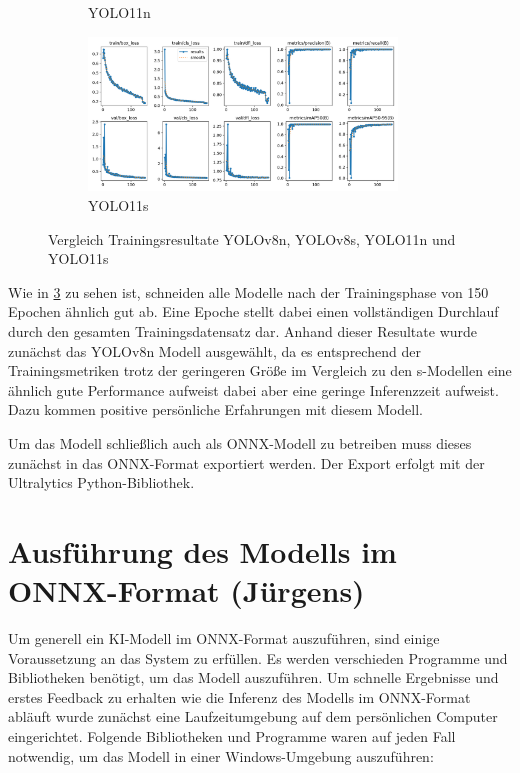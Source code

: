 \begin{figure}[h]
\begin{subfigure}[b]{0.45\textwidth}
  \caption{YOLO11n}
  \label{fig:Trainingsresultate yolo11n}
\end{subfigure}
\hfill
\begin{subfigure}[b]{0.45\textwidth}
  \centering
  \includegraphics[width=0.9\textwidth]{images/Trainingsresults_yolo11s.png}
  \caption{YOLO11s}
  \label{fig:Trainingsresultate yolo11s}
\end{subfigure}
\caption{Vergleich Trainingsresultate YOLOv8n, YOLOv8s, YOLO11n und YOLO11s}
\label{tab:Vergleich Trainingsresultate}
\end{figure}



Wie in \ref{tab:Vergleich Trainingsresultate} zu sehen ist, schneiden alle Modelle nach der Trainingsphase von 150 Epochen ähnlich gut ab. Eine Epoche stellt dabei einen vollständigen Durchlauf durch den gesamten Trainingsdatensatz dar.\cite{EpochGlossary} Anhand dieser Resultate wurde zunächst das YOLOv8n Modell ausgewählt, da es entsprechend der Trainingsmetriken trotz der geringeren Größe im Vergleich zu den s-Modellen eine ähnlich gute Performance aufweist dabei aber eine geringe Inferenzzeit aufweist. Dazu kommen positive persönliche Erfahrungen mit diesem Modell. 


Um das Modell schließlich auch als ONNX-Modell zu betreiben muss dieses zunächst in das ONNX-Format exportiert werden. Der Export erfolgt mit der Ultralytics Python-Bibliothek.

\section{Ausführung des Modells im ONNX-Format (Jürgens)}
Um generell ein KI-Modell im ONNX-Format auszuführen, sind einige Voraussetzung an das System zu erfüllen. Es werden verschieden Programme und Bibliotheken benötigt, um das Modell auszuführen. Um schnelle Ergebnisse und erstes Feedback zu erhalten wie die Inferenz des Modells im ONNX-Format abläuft wurde zunächst eine Laufzeitumgebung auf dem persönlichen Computer eingerichtet. Folgende Bibliotheken und Programme waren auf jeden Fall notwendig, um das Modell in einer Windows-Umgebung auszuführen:

